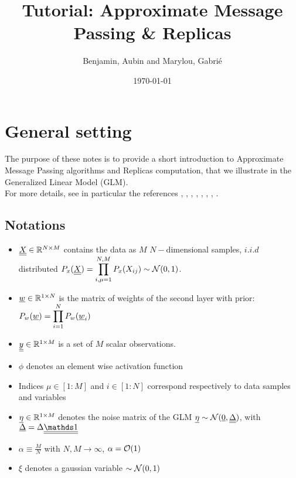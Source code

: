 \documentclass[aip,jmp,amsmath,amssymb,reprint]{revtex4}
\begin{document}
\title{\huge Tutorial: Approximate Message Passing \& Replicas}
\author{Benjamin, Aubin and Marylou, Gabrié}
\date{\today}
\maketitle

\tableofcontents
\newpage



\section{\Large General setting}
 The purpose of these notes is to provide a short introduction to Approximate Message Passing algorithms and Replicas computation, that we illustrate in the Generalized Linear Model (GLM).\\ 
 For more details, see in particular the references \cite{Mezard1987}, \cite{Castellani2005}, \cite{Barbier2017b}, \cite{Yedidia2001}, \cite{Krzakala2012}, \cite{Zdeborova2016}, \cite{Lesieur2017}, \cite{Aubin2018}.
  
\subsection{Notations}
\begin{itemize}
	\item $\underline{\underline{X}} \in \mathbb{R}^{N \times M}$ contains the data as $M$ $N-$dimensional samples, $i.i.d$ distributed  $P_x(\underline{\underline{X}}) = \displaystyle \prod_{i,\mu=1}^{N,M} P_x(X_{ij})\sim \mathcal{N}(0,1)$.
	\item ${\underline{w}}\in \mathbb{R}^{1 \times N}$ is the matrix of weights of the second layer with prior: $P_w({\underline{w}})= \displaystyle \prod_{i=1}^N P_w({\underline{w}}_i)$
	\item $\underline{\underline{y}} \in \mathbb{R}^{1 \times M}$ is a set of $M$ scalar observations.
	\item $\phi$ denotes an element wise activation function
	\item Indices $\mu \in [1:M]$ and $i\in[1:N]$ correspond respectively to data samples and variables
	\item ${\underline{\eta}} \in \mathbb{R}^{1 \times M} $ denotes the noise matrix of the GLM ${\underline{\eta}} \sim \mathcal{N}({\underline{0}},\underline{\underline{\Delta}})$, with $\ud{\Delta} = \Delta \du{\id}$ 
	\item $\alpha \equiv \frac{M}{N}$ with $N, M \to \infty$, $\alpha= \mathcal{O}(1)$
	\item $\xi$ denotes a gaussian variable $\sim \mathcal{N}(0,1)$
\end{itemize}
\end{document}

